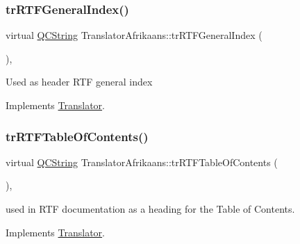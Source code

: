 \mbox{\label{class_translator_afrikaans_af82274d6cc41895f61a142e43e72d90d}} 
\subsubsection{\texorpdfstring{trRTFGeneralIndex()}{trRTFGeneralIndex()}}
{\footnotesize\ttfamily virtual \mbox{\hyperlink{class_q_c_string}{Q\+C\+String}} Translator\+Afrikaans\+::tr\+R\+T\+F\+General\+Index (\begin{DoxyParamCaption}{ }\end{DoxyParamCaption})\hspace{0.3cm}{\ttfamily [inline]}, {\ttfamily [virtual]}}

Used as header R\+TF general index 

Implements \mbox{\hyperlink{class_translator}{Translator}}.

\mbox{\label{class_translator_afrikaans_acae59a529d0a57deca09ae7a5bee35bf}} 
\subsubsection{\texorpdfstring{trRTFTableOfContents()}{trRTFTableOfContents()}}
{\footnotesize\ttfamily virtual \mbox{\hyperlink{class_q_c_string}{Q\+C\+String}} Translator\+Afrikaans\+::tr\+R\+T\+F\+Table\+Of\+Contents (\begin{DoxyParamCaption}{ }\end{DoxyParamCaption})\hspace{0.3cm}{\ttfamily [inline]}, {\ttfamily [virtual]}}

used in R\+TF documentation as a heading for the Table of Contents. 

Implements \mbox{\hyperlink{class_translator}{Translator}}.

\mbox{\label{class_translator_afrikaans_a4e68660c103efce348de83606cdfb810}} 

